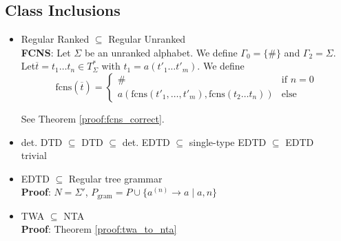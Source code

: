 \documentclass{article}
\begin{document}
\subsection{Class Inclusions}
\begin{itemize}
	\item Regular Ranked $\subseteq$ Regular Unranked \\
		\textbf{FCNS}: Let $\Sigma$ be an unranked alphabet. We define $\Gamma_0 = \{\#\}$ and $\Gamma_2 = \Sigma$. Let\linebreak $\overline{t} = t_1 \dots t_n \in T_\Sigma^*$ with $t_1 = a(t'_1 \dots t'_m)$. We define 
		$$\text{fcns}(\overline{t}) = \begin{cases}
			\# & \text{if } n = 0 \\
			a(\text{fcns}(t'_1, \dots, t'_m), \text{fcns}(t_2 \dots t_n)) & \text{else}
		\end{cases}$$
		
		See Theorem \ref{proof:fcns_correct}.
	\item det. DTD $\subseteq$ DTD $\subseteq$ det. EDTD $\subseteq$ single-type EDTD $\subseteq$ EDTD \\
		trivial
	\item EDTD $\subseteq$ Regular tree grammar \\
		\textbf{Proof}: $N = \Sigma'$, $P_\text{gram} = P \cup \{ a^{(n)} \rightarrow a \mid a, n\}$
	\item TWA $\subseteq$ NTA \\
		\textbf{Proof}: Theorem \ref{proof:twa_to_nta}
\end{itemize}
\end{document}
